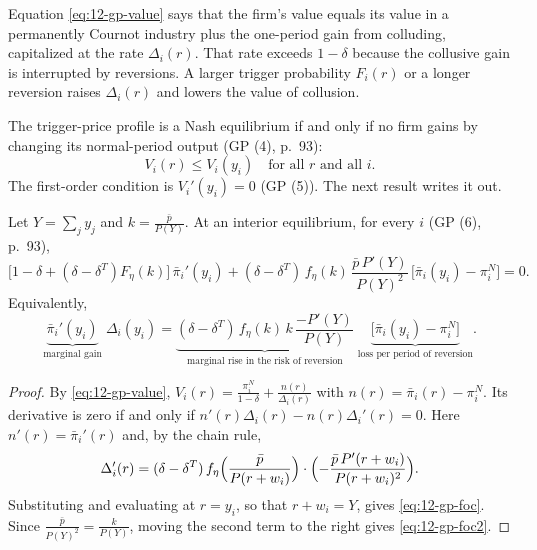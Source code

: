 Equation \eqref{eq:12-gp-value} says that the firm's value equals its value in a permanently Cournot industry plus
the one-period gain from colluding, capitalized at the rate $\Delta_i(r)$. That rate exceeds $1 - \delta$ because
the collusive gain is interrupted by reversions. A larger trigger probability $F_i(r)$ or a longer reversion raises
$\Delta_i(r)$ and lowers the value of collusion.

The trigger-price profile is a Nash equilibrium if and only if no firm gains by changing its normal-period output
(GP (4), p.~93):
\begin{equation}\label{eq:12-gp-eqm}
V_i(r) \le V_i(y_i) \quad\text{for all } r \text{ and all } i .
\end{equation}
The first-order condition is $V_i'(y_i) = 0$ (GP (5)). The next result writes it out.

\begin{proposition}\label{prop:12-gp-foc}
Let $Y = \sum_j y_j$ and $k = \frac{\bar p}{P(Y)}$. At an interior equilibrium, for every $i$ (GP (6), p.~93),
\begin{equation}\label{eq:12-gp-foc}
\bigl[1 - \delta + (\delta - \delta^T)F_\eta(k)\bigr]\,\bar\pi_i'(y_i)
+ (\delta - \delta^T)\,f_\eta(k)\,\frac{\bar p\,P'(Y)}{P(Y)^2}\,\bigl[\bar\pi_i(y_i) - \pi_i^N\bigr] = 0 .
\end{equation}
Equivalently,
\begin{equation}\label{eq:12-gp-foc2}
\underbrace{\bar\pi_i'(y_i)}_{\text{marginal gain}}\;\Delta_i(y_i)
= \underbrace{(\delta - \delta^T)\,f_\eta(k)\,k\,\frac{-P'(Y)}{P(Y)}}_{\text{marginal rise in the risk of reversion}}
\;\underbrace{\bigl[\bar\pi_i(y_i) - \pi_i^N\bigr]}_{\text{loss per period of reversion}} .
\end{equation}
\end{proposition}

\begin{proof}
By \eqref{eq:12-gp-value}, $V_i(r) = \frac{\pi_i^N}{1 - \delta} + \frac{n(r)}{\Delta_i(r)}$ with
$n(r) = \bar\pi_i(r) - \pi_i^N$. Its derivative is zero if and only if $n'(r)\Delta_i(r) - n(r)\Delta_i'(r) = 0$. Here
$n'(r) = \bar\pi_i'(r)$ and, by the chain rule,
\begin{equation*}
\Delta_i'(r) = (\delta - \delta^T)\,f_\eta\Bigl(\frac{\bar p}{P(r + w_i)}\Bigr)\cdot\Bigl(-\frac{\bar p\,P'(r + w_i)}{P(r + w_i)^2}\Bigr).
\end{equation*}
Substituting and evaluating at $r = y_i$, so that $r + w_i = Y$, gives \eqref{eq:12-gp-foc}. Since
$\frac{\bar p}{P(Y)^2} = \frac{k}{P(Y)}$, moving the second term to the right gives \eqref{eq:12-gp-foc2}.
\end{proof}

